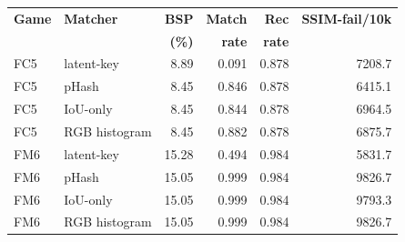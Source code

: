 \begin{tabular}{@{}llrrrr@{}}
\toprule
\textbf{Game} & \textbf{Matcher} & \textbf{BSP} & \textbf{Match} & \textbf{Rec} & \textbf{SSIM-fail/10k} \\
 & & \textbf{(\%)} & \textbf{rate} & \textbf{rate} & \\
\midrule
FC5 & latent-key & 8.89 & 0.091 & 0.878 & 7208.7 \\
FC5 & pHash & 8.45 & 0.846 & 0.878 & 6415.1 \\
FC5 & IoU-only & 8.45 & 0.844 & 0.878 & 6964.5 \\
FC5 & RGB histogram & 8.45 & 0.882 & 0.878 & 6875.7 \\
\midrule
FM6 & latent-key & 15.28 & 0.494 & 0.984 & 5831.7 \\
FM6 & pHash & 15.05 & 0.999 & 0.984 & 9826.7 \\
FM6 & IoU-only & 15.05 & 0.999 & 0.984 & 9793.3 \\
FM6 & RGB histogram & 15.05 & 0.999 & 0.984 & 9826.7 \\
\bottomrule
\end{tabular}
